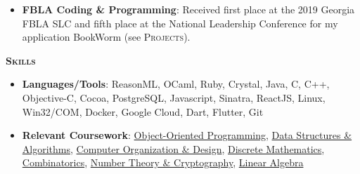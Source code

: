 \documentclass{article}
\newcommand{\sectionHeader}[1]{{\large \textbf{\textsc{#1}}}\hspace{5pt}\xrfill[.5ex]{.4pt}}
\begin{document}
  \begin{itemize}
    \item \textbf{FBLA Coding \& Programming}: Received first place at the 2019 Georgia FBLA SLC and fifth place at the National Leadership Conference for my application BookWorm (see \textsc{Projects}).
  \end{itemize}

  \vspace{8pt}

  \sectionHeader{Skills}
  \begin{itemize}
    \item \textbf{Languages/Tools}: ReasonML, OCaml, Ruby, Crystal, Java, C, C++, Objective-C, Cocoa, PostgreSQL, Javascript, Sinatra, ReactJS, Linux, Win32/COM, Docker, Google Cloud, Dart, Flutter, Git
    \item \textbf{Relevant Coursework}: \href{http://www.catalog.gatech.edu/search/?P=CS%201331}{Object-Oriented Programming}, \href{http://www.catalog.gatech.edu/search/?P=CS%201332}{Data Structures \& Algorithms}, \href{http://www.catalog.gatech.edu/search/?P=CS%202110}{Computer Organization \& Design}, \href{http://www.catalog.gatech.edu/search/?P=CS%202050}{Discrete Mathematics}, \href{https://people.math.gatech.edu/~trotter/math-3012/toppage.html}{Combinatorics}, \href{https://math.gatech.edu/courses/math/4803-hp}{Number Theory \& Cryptography}, \href{https://math.gatech.edu/courses/math/1554}{Linear Algebra}
  \end{itemize}
\end{document}
